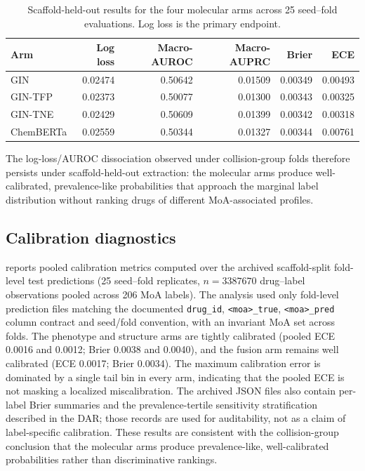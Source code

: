 \documentclass[11pt,a4paper]{article}
\begin{document}
\begin{table}[htbp]
\centering
\caption{Scaffold-held-out results for the four molecular arms across \num{25} seed--fold evaluations. Log loss is the primary endpoint.}
\label{tab:p6_scaffold_gnn}
\begin{tabular}{lrrrrr}
\toprule
Arm & Log loss & Macro-AUROC & Macro-AUPRC & Brier & ECE\\
\midrule
GIN & \num{0.02474} & \num{0.50642} & \num{0.01509} & \num{0.00349} & \num{0.00493}\\
GIN-TFP & \num{0.02373} & \num{0.50077} & \num{0.01300} & \num{0.00343} & \num{0.00325}\\
GIN-TNE & \num{0.02429} & \num{0.50609} & \num{0.01399} & \num{0.00342} & \num{0.00318}\\
ChemBERTa & \num{0.02559} & \num{0.50344} & \num{0.01327} & \num{0.00344} & \num{0.00761}\\
\bottomrule
\end{tabular}
\end{table}

The log-loss/AUROC dissociation observed under collision-group folds therefore persists under scaffold-held-out extraction: the molecular arms produce well-calibrated, prevalence-like probabilities that approach the marginal label distribution without ranking drugs of different MoA-associated profiles.

\subsection{Calibration diagnostics}

 reports pooled calibration metrics computed over the archived scaffold-split fold-level test predictions (\num{25} seed--fold replicates, $n=\num{3387670}$ drug--label observations pooled across \num{206} MoA labels). The analysis used only fold-level prediction files matching the documented \texttt{drug\_id}, \texttt{<moa>\_true}, \texttt{<moa>\_pred} column contract and seed/fold convention, with an invariant MoA set across folds. The phenotype and structure arms are tightly calibrated (pooled ECE \num{0.0016} and \num{0.0012}; Brier \num{0.0038} and \num{0.0040}), and the fusion arm remains well calibrated (ECE \num{0.0017}; Brier \num{0.0034}). The maximum calibration error is dominated by a single tail bin in every arm, indicating that the pooled ECE is not masking a localized miscalibration. The archived JSON files also contain per-label Brier summaries and the prevalence-tertile sensitivity stratification described in the DAR; those records are used for auditability, not as a claim of label-specific calibration. These results are consistent with the collision-group conclusion that the molecular arms produce prevalence-like, well-calibrated probabilities rather than discriminative rankings.
\end{document}
